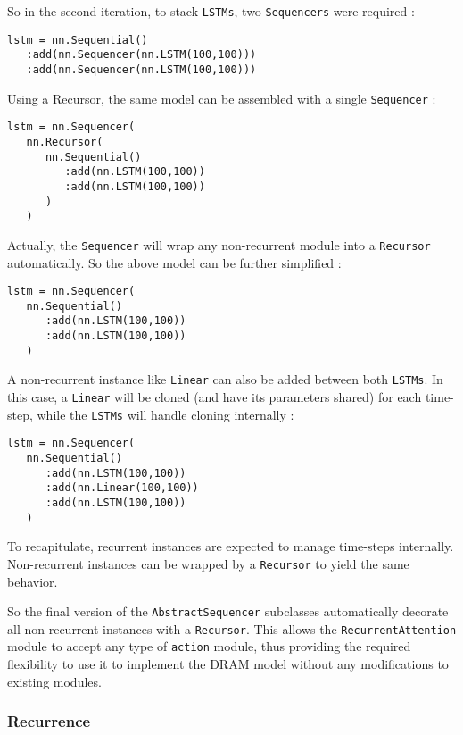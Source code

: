 \documentclass{article} %
\providecommand{\inlinecode}[1]{\texttt{#1}}
\begin{document}
So in the second iteration, to stack \inlinecode{LSTMs}, two \inlinecode{Sequencers} were required :

\begin{verbatim}
lstm = nn.Sequential()
   :add(nn.Sequencer(nn.LSTM(100,100)))
   :add(nn.Sequencer(nn.LSTM(100,100)))
\end{verbatim}

Using a Recursor, the same model can be assembled with a single \inlinecode{Sequencer} :

\begin{verbatim}
lstm = nn.Sequencer(
   nn.Recursor(
      nn.Sequential()
         :add(nn.LSTM(100,100))
         :add(nn.LSTM(100,100))
      )
   )
\end{verbatim}

Actually, the \inlinecode{Sequencer} will wrap any non-recurrent module into a \inlinecode{Recursor} automatically.
So the above model can be further simplified :

\begin{verbatim}
lstm = nn.Sequencer(
   nn.Sequential()
      :add(nn.LSTM(100,100))
      :add(nn.LSTM(100,100))
   )
\end{verbatim}

A non-recurrent instance like \inlinecode{Linear} can also be added between both \inlinecode{LSTMs}. 
In this case, a \inlinecode{Linear} will be cloned (and have its parameters shared) for each time-step, 
while the \inlinecode{LSTMs} will handle cloning internally :

\begin{verbatim}
lstm = nn.Sequencer(
   nn.Sequential()
      :add(nn.LSTM(100,100))
      :add(nn.Linear(100,100))
      :add(nn.LSTM(100,100))
   )
\end{verbatim}

To recapitulate, recurrent instances are expected to manage time-steps internally. 
Non-recurrent instances can be wrapped by a \inlinecode{Recursor} to yield the same behavior.

So the final version of the \inlinecode{AbstractSequencer} subclasses
automatically decorate all non-recurrent instances with a \inlinecode{Recursor}. 
This allows the \inlinecode{RecurrentAttention} module to accept 
any type of \inlinecode{action} module, thus providing the required flexibility to use it to 
implement the DRAM model without any modifications to existing modules.

\subsubsection{Recurrence}
\end{document}

